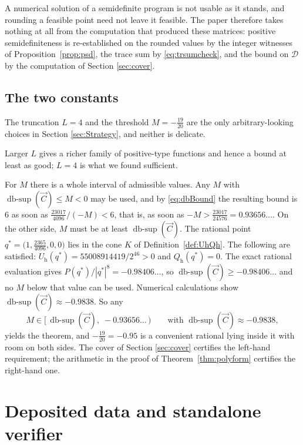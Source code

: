 \documentclass[reqno]{amsart}
\theoremstyle{definition}
\DeclareMathOperator{\dbsup}{db\text{-}sup}
\newcommand{\Dom}{\mathcal{D}}
\begin{document}
A numerical solution of a semidefinite program is not usable as it stands, and rounding a feasible
point need not leave it feasible. The paper therefore takes nothing at all from the computation
that produced these matrices: positive semidefiniteness is re-established on the rounded values by
the integer witnesses of Proposition~\ref{prop:psd}, the trace sum by \eqref{eq:trsumcheck}, and the bound on $\Dom$ by
the computation of Section \ref{sec:cover}.

\subsection{The two constants}
The truncation $L=4$ and the threshold $M=-\tfrac{19}{20}$ are the only arbitrary-looking choices
in Section \ref{sec:Strategy}, and neither is delicate.

Larger $L$ gives a richer family of positive-type functions and hence a bound at least as good;
$L=4$ is what we found sufficient.

For $M$ there is a whole interval of admissible values. Any $M$ with
$\dbsup(\overrightarrow C)\le M<0$ may be used, and by \eqref{eq:dbBound} the resulting bound is
$6$ as soon as $\tfrac{23017}{4096}\big/(-M)<6$, that is, as soon as
$-M>\tfrac{23017}{24576}=0.93656\ldots$. On the other side, $M$ must be at least
$\dbsup(\overrightarrow C)$. The rational point $q^{*}=\bigl(1,\tfrac{2365}{4096},0,0\bigr)$ lies
in the cone $K$ of Definition~\ref{def:UhQh}. The following are satisfied:
$U_{\mathrm h}(q^{*})=55008914419/2^{46}>0$ and $Q_{\mathrm h}(q^{*})=0$. The exact 
rational evaluation gives
$P(q^{*})/|q^{*}|^{8}=-0.98406\ldots$, so
$\dbsup(\overrightarrow C)\ge-0.98406\ldots$ and no $M$ below that value can be used.
Numerical calculations show $\dbsup(\overrightarrow C)\approx-0.9838$. So any
\[
M\in\bigl[\,\dbsup(\overrightarrow C),\;-0.93656\ldots\,\bigr)
\qquad\text{with }\dbsup(\overrightarrow C)\approx-0.9838,
\]
yields the theorem, and $-\tfrac{19}{20}=-0.95$ is a convenient rational lying inside it with room
on both sides. The cover of Section \ref{sec:cover} certifies the left-hand requirement;
the arithmetic in the proof of Theorem~\ref{thm:polyform} certifies the right-hand one.


\appendix
 

\section{Deposited data and standalone verifier}\label{app:data}
\end{document}
